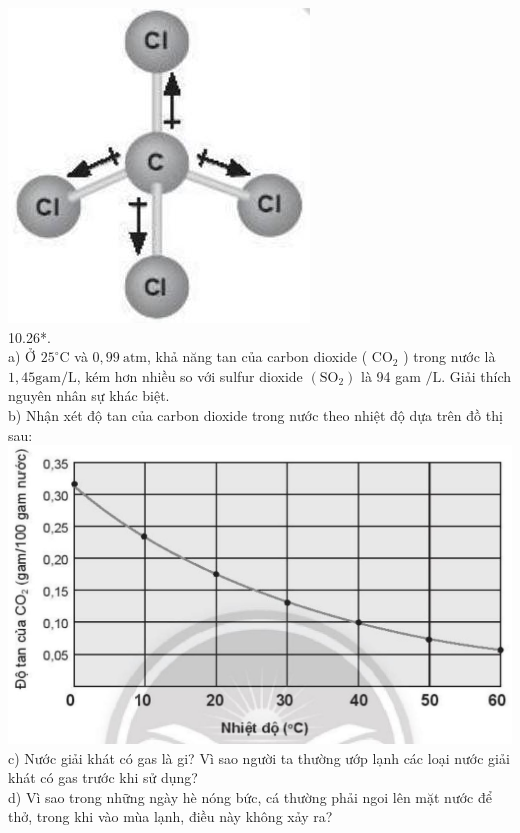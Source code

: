 \documentclass[10pt]{article}
\begin{document}
\includegraphics[max width=\textwidth, center]{2025_10_23_883c4b146e2332109fcdg-32(2)}\\
10.26*.\\
a) Ở $25^{\circ} \mathrm{C}$ và $0,99 \mathrm{~atm}$, khả năng tan của carbon dioxide ( $\mathrm{CO}_{2}$ ) trong nước là $1,45 \mathrm{gam} / \mathrm{L}$, kém hơn nhiều so với sulfur dioxide $\left(\mathrm{SO}_{2}\right)$ là 94 gam $/ \mathrm{L}$. Giải thích nguyên nhân sự khác biệt.\\
b) Nhận xét độ tan của carbon dioxide trong nước theo nhiệt độ dựa trên đồ thị sau:\\
\includegraphics[max width=\textwidth, center]{2025_10_23_883c4b146e2332109fcdg-33}\\
c) Nước giải khát có gas là gi? Vì sao người ta thường ướp lạnh các loại nước giải khát có gas trước khi sử dụng?\\
d) Vì sao trong những ngày hè nóng bức, cá thường phải ngoi lên mặt nước để thở, trong khi vào mùa lạnh, điều này không xảy ra?
\end{document}

